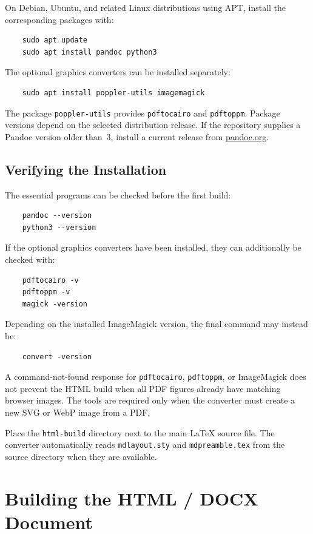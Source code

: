 \documentclass[
11pt,
a4paper,
oneside
]{scrbook}
\begin{document}
{On Debian, Ubuntu, and related Linux distributions using APT, install the
corresponding packages with:
\begin{verbatim}
	sudo apt update
	sudo apt install pandoc python3
\end{verbatim}
The optional graphics converters can be installed separately:
\begin{verbatim}
	sudo apt install poppler-utils imagemagick
\end{verbatim}
The package \texttt{poppler-utils} provides \texttt{pdftocairo} and
\texttt{pdftoppm}. Package versions depend on the selected distribution
release. If the repository supplies a Pandoc version older than~3, install a
current release from \href{https://pandoc.org/installing.html}{pandoc.org}.

\subsection{Verifying the Installation}

The essential programs can be checked before the first build:
\begin{verbatim}
	pandoc --version
	python3 --version
\end{verbatim}
If the optional graphics converters have been installed, they can additionally
be checked with:
\begin{verbatim}
	pdftocairo -v
	pdftoppm -v
	magick -version
\end{verbatim}
Depending on the installed ImageMagick version, the final command may instead
be:
\begin{verbatim}
	convert -version
\end{verbatim}
A command-not-found response for \texttt{pdftocairo}, \texttt{pdftoppm}, or
ImageMagick does not prevent the HTML build when all PDF figures already have
matching browser images. The tools are required only when the converter must
create a new SVG or WebP image from a PDF.

Place the \texttt{html-build} directory next to the main \LaTeX{} source file.
The converter automatically reads \texttt{mdlayout.sty} and
\texttt{mdpreamble.tex} from the source directory when they are available.

\section{Building the HTML / DOCX Document}

}
\end{document}
